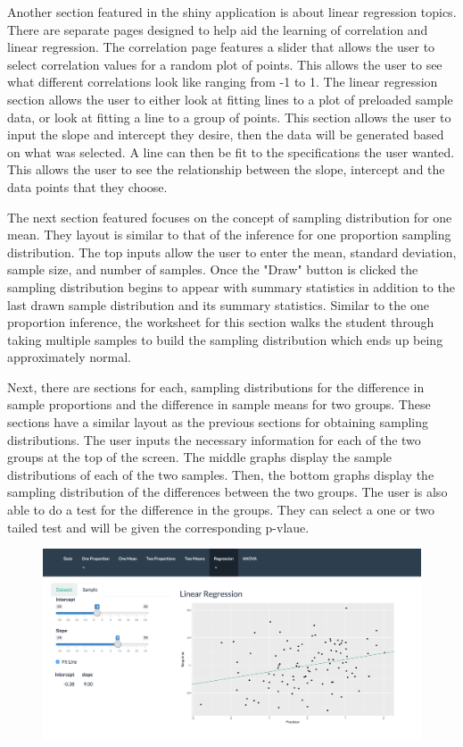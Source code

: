 \documentclass[11pt]{book}
\begin{document}
Another section featured in the shiny application is  about linear regression topics.  There are separate pages designed to help aid the learning of correlation and linear regression.  The correlation page features a slider that allows the user to select correlation values for a random plot of points.  This allows the user to see what different correlations look like ranging from -1 to 1.  The linear regression section allows the user to either look at fitting lines to a plot of preloaded sample data, or look at fitting a line to a group of points.  This section allows the user to input the slope and intercept they desire, then the data will be generated based on what was selected.  A line can then be fit to the specifications the user wanted.  This allows the user to see the relationship between the slope, intercept and the data points that they choose.  

The next section featured focuses on the concept of sampling distribution for one mean. They layout is similar to that of the inference for one proportion sampling distribution.  The top inputs allow the user to enter the mean, standard deviation, sample size, and number of samples.  Once the "Draw" button is clicked the sampling distribution begins to appear with summary statistics in addition to the last drawn sample distribution and its summary statistics.   Similar to the one proportion inference, the worksheet for this section walks the student through taking multiple samples to build the sampling distribution which ends up being approximately normal.

Next, there are sections for each, sampling distributions for the difference in sample proportions and the difference in sample means for two groups.  These sections have a similar layout as the previous sections for obtaining sampling distributions.  The user inputs the necessary information for each of the two groups at the top of the screen.  The middle graphs display the sample distributions of each of the two samples.  Then, the bottom graphs display the sampling distribution of the differences between the two groups.  The user is also able to do a test for the difference in the groups.  They can select a one or two tailed test and will be given the corresponding p-vlaue.  


\begin{figure}
\centering
      \includegraphics[width=\textwidth]{LinReg.png}
\end{figure}
\end{document}

